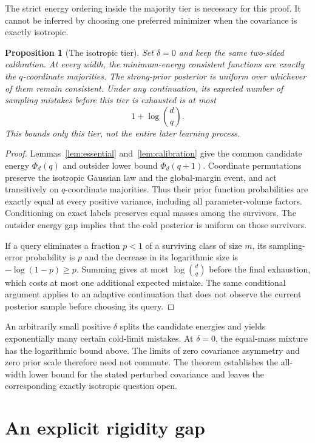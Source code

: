 \documentclass[11pt]{article}
\newtheorem{proposition}[theorem]{Proposition}
\begin{document}
The strict energy ordering inside the majority tier is necessary for
this proof. It cannot be inferred by choosing one preferred minimizer
when the covariance is exactly isotropic.

\begin{proposition}[The isotropic tier]\label{prop:isotropic}
Set $\delta=0$ and keep the same two-sided calibration.
At every width, the minimum-energy consistent functions are exactly
the $q$-coordinate majorities. The strong-prior posterior is uniform
over whichever of them remain consistent. Under any continuation,
its expected number of sampling mistakes before this tier is exhausted
is at most
\[
 1+\log\binom d q.
\]
This bounds only this tier, not the entire later learning process.
\end{proposition}
\begin{proof}
Lemmas~\ref{lem:essential} and~\ref{lem:calibration} give the common
candidate energy $\Phi_d(q)$ and outsider lower bound $\Phi_d(q+1)$.
Coordinate permutations preserve the isotropic Gaussian law and the
global-margin event, and act transitively on $q$-coordinate majorities.
Thus their prior function probabilities are exactly equal at every
positive variance, including all parameter-volume factors.
Conditioning on exact labels preserves equal masses among the survivors.
The outsider energy gap implies that the cold posterior is uniform
on those survivors.

If a query eliminates a fraction $p<1$ of a surviving class of size
$m$, its sampling-error probability is $p$ and the decrease in its
logarithmic size is $-\log(1-p)\ge p$. Summing gives at most
$\log\binom d q$ before the final exhaustion, which costs at most
one additional expected mistake. The same conditional argument applies
to an adaptive continuation that does not observe the current posterior
sample before choosing its query.
\end{proof}

An arbitrarily small positive $\delta$ splits the candidate energies
and yields exponentially many certain cold-limit mistakes. At
$\delta=0$, the equal-mass mixture has the logarithmic bound above.
The limits of zero covariance asymmetry and zero prior scale therefore
need not commute. The theorem establishes the all-width lower bound
for the stated perturbed covariance and leaves the corresponding
exactly isotropic question open.

\appendix
\section{An explicit rigidity gap}\label{sec:quantitative}
\end{document}
